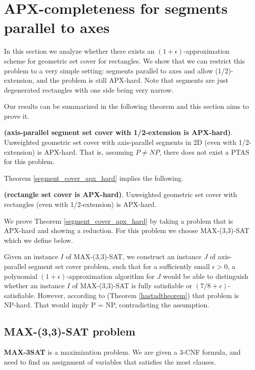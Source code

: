 \section{APX-completeness for segments parallel to axes}
\label{section:segment_apx}

In this section we analyze whether there exists an
$(1+\epsilon)$-approximation
scheme for geometric set cover for rectangles.
We show that we can restrict this problem
to a very simple setting:
segments parallel to axes and allow (1/2)-extension,
and the problem is still APX-hard.
Note that segments are just degenerated rectangles
with one side being very narrow.


Our results can be summarized in the following
theorem and this section aims to prove it.

\begin{tw}{
\label{segment_cover_apx_hard}
	\textbf{(axis-parallel segment set cover with 1/2-extension is APX-hard)}.	
	Unweighted geometric set cover
	with axis-parallel segments in 2D (even with 1/2-extension)
	is APX-hard.
	That is, assuming $P\neq NP$, there does not exist a PTAS
	for this problem.
}\end{tw}
 
Theorem \ref{segment_cover_apx_hard} implies the following.

\begin{corollary}{
\label{rectangle_cover_apx_hard}
	\textbf{(rectangle set cover is APX-hard)}.	
	Unweighted geometric set cover
	with rectangles (even with 1/2-extension) is APX-hard.
}\end{corollary}


We prove Theorem \ref{segment_cover_apx_hard}
by taking a problem that is APX-hard
and showing a reduction.
For this problem we choose
MAX-(3,3)-SAT which we define below.

Given an instance $I$ of MAX-(3,3)-SAT,
we construct an instance $J$ of 
axis-parallel segment set cover problem,
such that for a sufficiently small $\epsilon > 0$,
a polynomial $(1+\epsilon)$-approximation algorithm for $J$
would be able to distinguish  whether an instance $I$ of MAX-(3,3)-SAT
is fully satisfiable
or $(7/8 + \epsilon)$-satisfiable.
However, according to (Theorem \ref{hastadtheorem}) that problem
is NP-hard.
That would imply P = NP, contradicting the assumption.

\subsection{MAX-(3,3)-SAT problem}
\begin{defi}
\textbf{MAX-3SAT} is a maximization problem. We are given a 3-CNF
formula, and need to find an assignment of variables
that satisfies the most clauses.
\end{defi}

